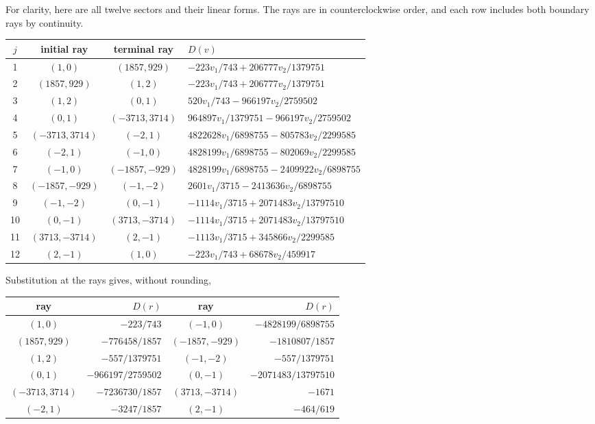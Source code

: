 \documentclass[11pt,reqno,letterpaper]{amsart}
\numberwithin{equation}{section}
\theoremstyle{definition}
\theoremstyle{remark}
\begin{document}
For clarity, here are all twelve sectors and their linear forms.  The
rays are in counterclockwise order, and each row includes both boundary
rays by continuity.
\begin{center}
\small
\begin{tabular}{c|c|c|l}
\toprule
\(j\)&initial ray&terminal ray&\(D(v)\)\\
\midrule
1&\((1,0)\)&\((1857,929)\)&\(-223v_1/743+206777v_2/1379751\)\\
2&\((1857,929)\)&\((1,2)\)&\(-223v_1/743+206777v_2/1379751\)\\
3&\((1,2)\)&\((0,1)\)&\(520v_1/743-966197v_2/2759502\)\\
4&\((0,1)\)&\((-3713,3714)\)&\(964897v_1/1379751-966197v_2/2759502\)\\
5&\((-3713,3714)\)&\((-2,1)\)&\(4822628v_1/6898755-805783v_2/2299585\)\\
6&\((-2,1)\)&\((-1,0)\)&\(4828199v_1/6898755-802069v_2/2299585\)\\
7&\((-1,0)\)&\((-1857,-929)\)&\(4828199v_1/6898755-2409922v_2/6898755\)\\
8&\((-1857,-929)\)&\((-1,-2)\)&\(2601v_1/3715-2413636v_2/6898755\)\\
9&\((-1,-2)\)&\((0,-1)\)&\(-1114v_1/3715+2071483v_2/13797510\)\\
10&\((0,-1)\)&\((3713,-3714)\)&\(-1114v_1/3715+2071483v_2/13797510\)\\
11&\((3713,-3714)\)&\((2,-1)\)&\(-1113v_1/3715+345866v_2/2299585\)\\
12&\((2,-1)\)&\((1,0)\)&\(-223v_1/743+68678v_2/459917\)\\
\bottomrule
\end{tabular}
\end{center}
Substitution at the rays gives, without rounding,
\begin{center}
\begin{tabular}{c|r@{\qquad}c|r}
\toprule
ray&\(D(r)\)&ray&\(D(r)\)\\
\midrule
\((1,0)\)&\(-223/743\)&\((-1,0)\)&\(-4828199/6898755\)\\
\((1857,929)\)&\(-776458/1857\)&\((-1857,-929)\)&\(-1810807/1857\)\\
\((1,2)\)&\(-557/1379751\)&\((-1,-2)\)&\(-557/1379751\)\\
\((0,1)\)&\(-966197/2759502\)&\((0,-1)\)&\(-2071483/13797510\)\\
\((-3713,3714)\)&\(-7236730/1857\)&\((3713,-3714)\)&\(-1671\)\\
\((-2,1)\)&\(-3247/1857\)&\((2,-1)\)&\(-464/619\)\\
\bottomrule
\end{tabular}
\end{center}
\end{document}
